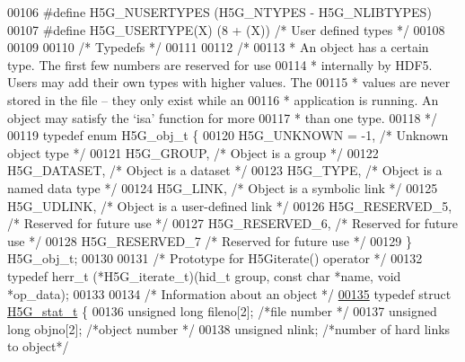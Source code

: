 \begin{DoxyCode}
00106 \textcolor{preprocessor}{#define H5G\_NUSERTYPES  (H5G\_NTYPES - H5G\_NLIBTYPES)}
00107 \textcolor{preprocessor}{#define H5G\_USERTYPE(X) (8 + (X))   }\textcolor{comment}{/* User defined types       */}\textcolor{preprocessor}{}
00108 
00109 
00110 \textcolor{comment}{/* Typedefs */}
00111 
00112 \textcolor{comment}{/*}
00113 \textcolor{comment}{ * An object has a certain type. The first few numbers are reserved for use}
00114 \textcolor{comment}{ * internally by HDF5. Users may add their own types with higher values.  The}
00115 \textcolor{comment}{ * values are never stored in the file -- they only exist while an}
00116 \textcolor{comment}{ * application is running.  An object may satisfy the `isa' function for more}
00117 \textcolor{comment}{ * than one type.}
00118 \textcolor{comment}{ */}
00119 \textcolor{keyword}{typedef} \textcolor{keyword}{enum} H5G\_obj\_t \{
00120     H5G\_UNKNOWN = -1,       \textcolor{comment}{/* Unknown object type      */}
00121     H5G\_GROUP,              \textcolor{comment}{/* Object is a group        */}
00122     H5G\_DATASET,        \textcolor{comment}{/* Object is a dataset      */}
00123     H5G\_TYPE,           \textcolor{comment}{/* Object is a named data type  */}
00124     H5G\_LINK,               \textcolor{comment}{/* Object is a symbolic link    */}
00125     H5G\_UDLINK,             \textcolor{comment}{/* Object is a user-defined link */}
00126     H5G\_RESERVED\_5,     \textcolor{comment}{/* Reserved for future use  */}
00127     H5G\_RESERVED\_6,     \textcolor{comment}{/* Reserved for future use  */}
00128     H5G\_RESERVED\_7      \textcolor{comment}{/* Reserved for future use  */}
00129 \} H5G\_obj\_t;
00130 
00131 \textcolor{comment}{/* Prototype for H5Giterate() operator */}
00132 \textcolor{keyword}{typedef} herr\_t (*H5G\_iterate\_t)(hid\_t group, \textcolor{keyword}{const} \textcolor{keywordtype}{char} *name, \textcolor{keywordtype}{void} *op\_data);
00133 
00134 \textcolor{comment}{/* Information about an object */}
\hyperlink{struct_h5_g__stat__t}{00135} \textcolor{keyword}{typedef} \textcolor{keyword}{struct }\hyperlink{struct_h5_g__stat__t}{H5G\_stat\_t} \{
00136     \textcolor{keywordtype}{unsigned} \textcolor{keywordtype}{long}   fileno[2];  \textcolor{comment}{/*file number           */}
00137     \textcolor{keywordtype}{unsigned} \textcolor{keywordtype}{long}   objno[2];   \textcolor{comment}{/*object number         */}
00138     \textcolor{keywordtype}{unsigned}        nlink;      \textcolor{comment}{/*number of hard links to object*/}

\end{DoxyCode}
